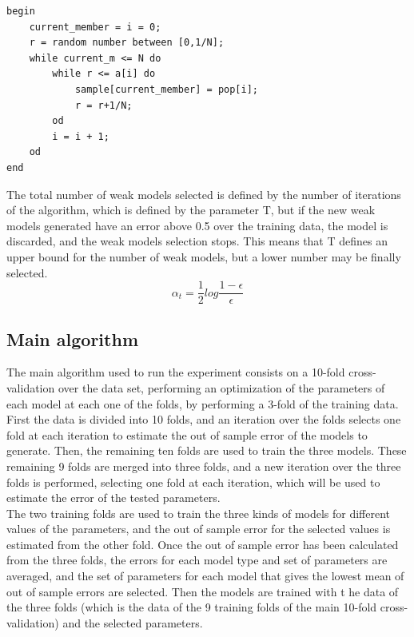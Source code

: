 \documentclass[10pt, journal]{IEEEtran}
\begin{document}
\begin{footnotesize}
	\begin{verbatim}
begin
    current_member = i = 0;
    r = random number between [0,1/N];
    while current_m <= N do
        while r <= a[i] do
            sample[current_member] = pop[i];
            r = r+1/N;
        od
        i = i + 1;
    od
end
	\end{verbatim}
\end{footnotesize}

The total number of weak models selected is defined by the number of iterations of the algorithm, which is defined by the parameter T, but if the new weak models generated have an error above 0.5 over the training data, the model is discarded, and the weak models selection stops. This means that T defines an upper bound for the number of weak models, but a lower number may be finally selected.\\

\begin{equation}
	\alpha_t = \frac{1}{2}log\frac{1-\epsilon}{\epsilon}
	\label{eq:ada_alpha}
\end{equation}


\subsection{Main algorithm} %
\label{sub:main_algorithm}
The main algorithm used to run the experiment consists on a 10-fold cross-validation over the data set, performing an optimization of the parameters of each model at each one of the folds, by performing a 3-fold of the training data.\\

First the data is divided into 10 folds, and an iteration over the folds selects one fold at each iteration to estimate the out of sample error of the models to generate. Then, the remaining ten folds are used to train the three models. These remaining 9 folds are merged into three folds, and a new iteration over the three folds is performed, selecting one fold at each iteration, which will be used to estimate the error of the tested parameters.\\

The two training folds are used to train the three kinds of models for different values of the parameters, and the out of sample error for the selected values is estimated from the other fold. Once the out of sample error has been calculated from the three folds, the errors for each model type and set of parameters are averaged, and the set of parameters for each model that gives the lowest mean of out of sample errors are selected. Then the models are trained with t	he data of the three folds (which is the data of the 9 training folds of the main 10-fold cross-validation) and the selected parameters.\\
\end{document}
